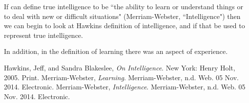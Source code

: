\documentclass[11pt, oneside]{article}
\begin{document}
\par If can define true intelligence to be ``the ability to learn or understand things or to deal with new or difficult situations" (Merriam-Webster, ``Intelligence") then we can begin to look at Hawkins definition of intelligence, and if that be used to represent true intelligence. 

\par In addition, in the definition of learning there was an aspect of experience. 











\begin{thebibliography}{9}
  Hawkins, Jeff, and Sandra Blakeslee,
  \emph{On Intelligence}.
  New York: Henry Holt, 2005.
  Print.
  Merriam-Webster,
  \emph{Learning}.
  Merriam-Webster, n.d. Web. 05 Nov. 2014.
  Electronic.
  Merriam-Webster,
  \emph{Intelligence}.
  Merriam-Webster, n.d. Web. 05 Nov. 2014.
  Electronic.
\end{thebibliography}
\end{document}
